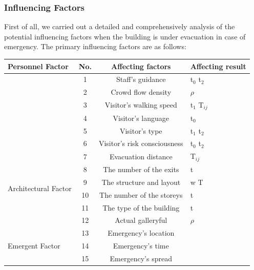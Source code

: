 \documentclass[12pt]{article}
\begin{document}
\subsubsection{Influencing Factors}
First of all, we carried out a detailed and comprehensively analysis of the potential influencing factors when the building is under evacuation in case of emergency. The primary influencing factors are as follows:


\begin{table}[ht]
	\begin{center}
	\begin{tabular}{p{4cm}<{\centering}|c|c|p{3cm}<{\centering}} \hline
		\multirow{7}{*}{ Personnel Factor }
		 & No. & Affecting factors &  Affecting result \\ \hline
		 & 1 & Staff's guidance  &   t$_{0}$ t$_{2}$   \\ \cline{2-4} 
		 & 2 & Crowd flow density  &   $\rho$   \\ \cline{2-4} 
		 & 3 & Visitor's walking speed  &  t$_{1}$   T$_{ij}$  \\ \cline{2-4} 
		 & 4 &Visitor's language  &     t$_{0}$  \\ \cline{2-4}
		& 5 & Visitor's type  &   t$_{1}$ t$_{2}$   \\ \cline{2-4} 
		& 6 & Visitor's risk consciousness  &  t$_{0}$ t$_{2}$   \\ \hline
		\multirow{6}{*}{Architectural Factor}
		  & 7 & Evacuation distance  &   T$_{ij}$    \\ \cline{2-4} 
		& 8 & The number of the exits  &    t  \\ \cline{2-4} 
		  & 9 & The structure and layout  &  w T    \\ \cline{2-4}
		  & 10 & The number of the storeys  &   t   \\ \cline{2-4}  
		  & 11 & The type of the building   &    t  \\ \cline{2-4} 
		  & 12 & Actual galleryful  &    $\rho$  \\ \hline
		\multirow{3}{*}{Emergent Factor}
		 & 13 & Emergency's location  &    \\ \cline{2-4}
		 & 14 & Emergency's time  &    \\ \cline{2-4}
		 & 15 & Emergency's spread   &    \\ \hline
		\end{tabular}
		
	\end{center}
\end{table}
\end{document}

